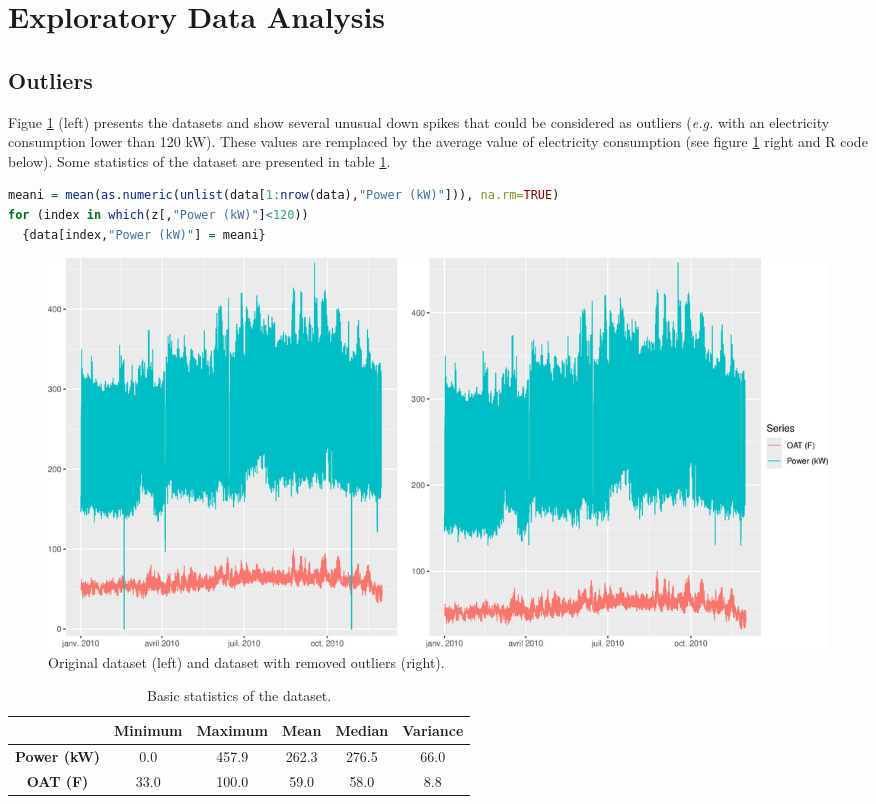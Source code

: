 \section{Exploratory Data Analysis}

\subsection{Outliers}
Figue \ref{figure_dataset} (left) presents the datasets and show several unusual down spikes that 
could be considered as outliers (\textit{e.g.} with an electricity consumption lower than 120 kW). 
These values are remplaced by the average value of electricity consumption (see figure 
\ref{figure_dataset} right and R code below). Some statistics of the dataset are presented in table 
\ref{table_dataset}.


\begin{lstlisting}[language=R]
meani = mean(as.numeric(unlist(data[1:nrow(data),"Power (kW)"])), na.rm=TRUE)
for (index in which(z[,"Power (kW)"]<120))
  {data[index,"Power (kW)"] = meani}
\end{lstlisting} 

\begin{figure}[H]
\centering
 \includegraphics[scale=0.4]{figures/dataset.png}
\caption{Original dataset (left) and dataset with removed outliers (right).}
\label{figure_dataset}
\end{figure}

\begin{table}[H]
\centering \begin{tabular}{c|ccccc}
 & \textbf{Minimum} & \textbf{Maximum} & \textbf{Mean} & \textbf{Median} & \textbf{Variance} \\ \hline
\textbf{Power (kW)} &  0.0 & 457.9 & 262.3 & 276.5 & 66.0 \\
\textbf{OAT (F)}    & 33.0 & 100.0 &  59.0 &  58.0 & 8.8 \\
\end{tabular}
\caption{Basic statistics of the dataset.}
\label{table_dataset}
\end{table}



